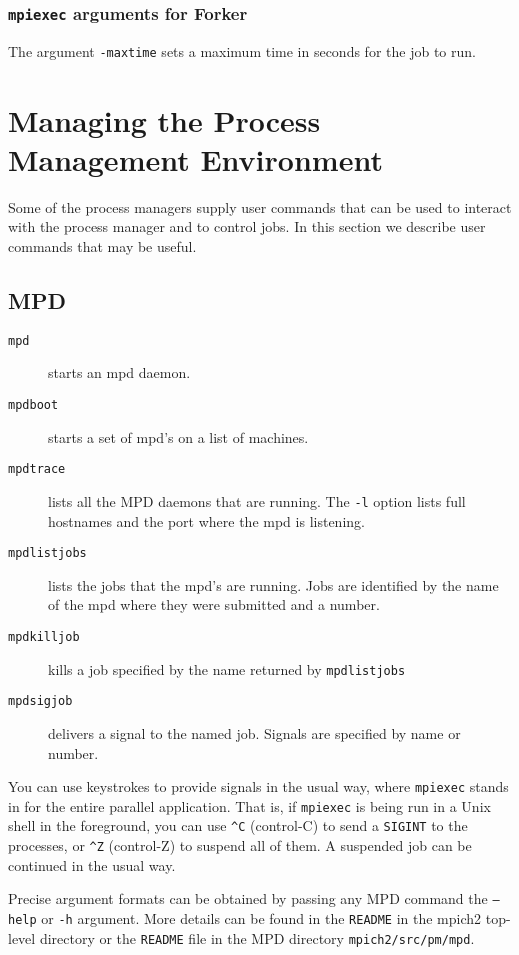\documentclass[dvipdfm,11pt]{article}
\begin{document}
\subsubsection{\texttt{mpiexec} arguments for Forker}
\label{sec:mpiexec-forker}

The argument \texttt{-maxtime} sets a maximum time in seconds for the
job to run.


\section{Managing the Process Management Environment}
\label{sec:managing-pme}

Some of the process managers supply user commands that can be used to
interact with the process manager and to control jobs.  In this section
we describe user commands that may be useful.

\subsection{MPD}
\label{sec:managing-mpd}

\begin{description}
\item[\texttt{mpd}]  starts an mpd daemon.
\item[\texttt{mpdboot}] starts a set of mpd's on a list of machines.
\item[\texttt{mpdtrace}] lists all the MPD daemons that are running.  The
  \texttt{-l} option lists full hostnames and the port where the mpd is
  listening.
\item[\texttt{mpdlistjobs}] lists the jobs that the mpd's are running.
  Jobs are identified by the name of the mpd where they were submitted
  and a number.
\item[\texttt{mpdkilljob}] kills a job specified by the name returned by
  \texttt{mpdlistjobs }
\item[\texttt{mpdsigjob}] delivers a signal to the named job.  Signals
  are specified by name or number.
\end{description}
You can use keystrokes to provide signals in the usual way, where
\texttt{mpiexec} stands in for the entire parallel application.  That
is, if \texttt{mpiexec} is being run in a Unix shell in the foreground,
you can use \verb+^C+ (control-C) to send a \texttt{SIGINT} to the
processes, or \verb+^Z+ (control-Z) to suspend all of them.  A suspended
job can be continued in the usual way.

Precise argument formats can be obtained by passing any MPD command the
\texttt{--help} or \texttt{-h} argument.  More details can be found in
the \texttt{README} in the mpich2 top-level directory or the
\texttt{README} file in the MPD directory \texttt{mpich2/src/pm/mpd}.
\end{document}
